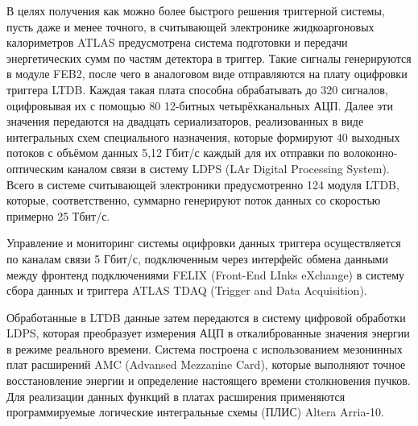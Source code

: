 В целях получения как можно более быстрого решения триггерной системы, пусть даже и менее точного, в считывающей электронике жидкоаргоновых калориметров ATLAS предусмотрена система подготовки и передачи энергетических сумм по частям детектора в триггер. Такие сигналы генерируются в модуле FEB2, после чего в аналоговом виде отправляются на плату оцифровки триггера LTDB. Каждая такая плата способна обрабатывать до 320 сигналов, оцифровывая их с помощью 80 12-битных четырёхканальных АЦП\parencite{ltdb}. Далее эти значения передаются на двадцать сериализаторов, реализованных в виде интегральных схем специального назначения, которые формируют 40 выходных потоков с объёмом данных 5,12 Гбит/с каждый для их отправки по волоконно-оптическим каналом связи в систему LDPS (LAr Digital Processing System). Всего в системе считывающей электроники предусмотренно 124 модуля LTDB, которые, соответственно, суммарно генерируют поток данных со скоростью примерно 25 Тбит/с.\par
Управление и мониторинг системы оцифровки данных триггера осуществляется по каналам связи 5 Гбит/с, подключенным через интерфейс обмена данными между фронтенд подключениями FELIX (Front-End LInks eXchange) в систему сбора данных и триггера ATLAS TDAQ (Trigger and Data Acquisition).\par
Обработанные в LTDB данные затем передаются в систему цифровой обработки LDPS, которая преобразует измерения АЦП в откалиброванные значения энергии в режиме реального времени. Система построена с использованием мезонинных плат расширений AMC (Advansed Mezzanine Card), которые выполняют точное восстановление энергии и определение настоящего времени столкновения пучков. Для реализации данных функций в платах расширения применяются программируемые логические интегральные схемы (ПЛИС) Altera Arria-10.\par
